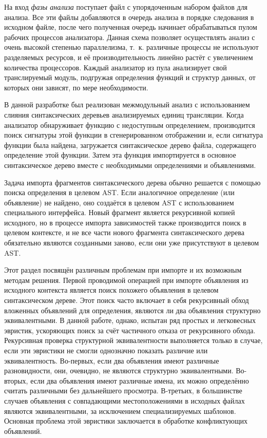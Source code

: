 На вход \textit{фазы анализа} поступает файл с упорядоченным набором файлов для анализа. Все эти файлы добавляются в очередь анализа в порядке следования в исходном файле, после чего полученная очередь начинает обрабатываться пулом рабочих процессов анализатора. Данная схема позволяет осуществлять анализ с очень высокой степенью параллелизма, т.~к. различные процессы не используют разделяемых ресурсов, и её производительность линейно растёт с увеличением количества процессоров. Каждый анализатор из пула анализирует свой транслируемый модуль, подгружая определения функций и структур данных, от которых они зависят, по мере необходимости.

В данной разработке был реализован межмодульный анализ с использованием слияния синтаксических деревьев анализируемых единиц трансляции. Когда анализатор обнаруживает функцию с недоступным определением, производится поиск сигнатуры этой функции в сгенерированном отображении и, если сигнатура функции была найдена, загружается синтаксическое дерево файла, содержащего определение этой функции. Затем эта функция импортируется в основное синтаксическое дерево вместе с необходимыми определениями и объявлениями.

Задача импорта фрагментов синтаксического дерева обычно решается с помощью поиска определения в целевом AST. Если аналогичное определение (или объявление) не найдено, оно создаётся в целевом AST с использованием специального интерфейса. Новый фрагмент является рекурсивной копией исходного, но в процессе импорта зависимостей также производится поиск в целевом контексте, и не все части нового фрагмента синтаксического дерева обязательно являются созданными заново, если они уже присутствуют в целевом AST.

Этот раздел посвящён различным проблемам при импорте и их возможным методам решения. Первой проводимой операцией при импорте объявления из исходного контекста является поиск похожего объявления в целевом синтаксическом дереве. Этот поиск часто включает в себя рекурсивный обход вложенных объявлений для определения, являются ли два объявления структурно эквивалентными. В данной работе, однако, испытан ряд простых и легковесных эвристик, ускоряющих поиск за счёт частичного отказа от рекурсивного обхода. Рекурсивная проверка структурной эквивалентности выполняется только в случае, если эти эвристики не смогли однозначно показать различие или эквивалентность. Во-первых, если два объявления имеют различные разновидности, они, очевидно, не являются структурно эквивалентными. Во-вторых, если два объявления имеют различные имена, их можно определённо считать различными без дальнейшего просмотра. В-третьих, в большинстве случаев объявления с совпадающими местоположениями в исходных файлах являются эквивалентными, за исключением специализируемых шаблонов. Основная проблема этой эвристики заключается в обработке конфликтующих объявлений.

